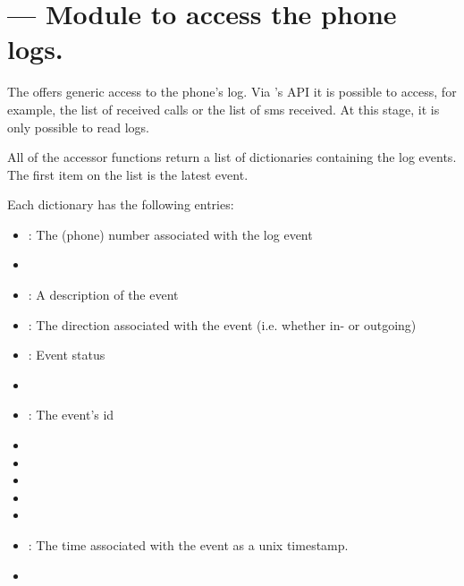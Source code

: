 %
%
%

\section{ ---
  Module to access the phone logs.}
\label{sec:logs}


The  offers generic access to the phone's log. Via 's API
it is possible to access, for example, the list of received calls or the list of sms received.
At this stage, it is only possible to read logs.

All of the accessor functions return a list of dictionaries containing
the log events. The first item on the list is the latest event.

Each dictionary has the following entries:
\begin{itemize}
\item {}: The (phone) number associated with the log event
\item {}
\item {}: A description of the event
\item {}: The direction associated with the event (i.e. whether in- or outgoing)
\item {}: Event status
\item {}
\item {}: The event's id
\item {}
\item {}
\item {}
\item {}
\item {}
\item {}: The time associated with the event as a unix timestamp.
\item {}
\end{itemize}

